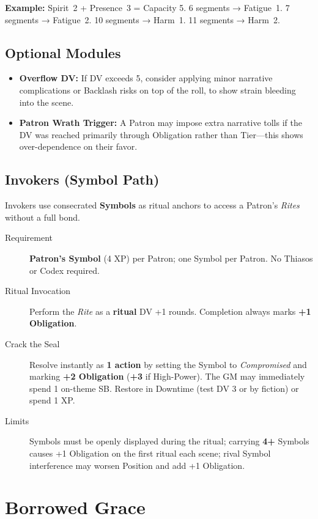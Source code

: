 \textbf{Example:} Spirit~2 + Presence~3 = Capacity 5.
6 segments → Fatigue~1.
7 segments → Fatigue~2.
10 segments → Harm~1.
11 segments → Harm~2.

\subsection*{Optional Modules}

\begin{itemize}
  \item \textbf{Overflow DV:} If DV exceeds 5, consider applying minor narrative complications or Backlash risks on top of the roll, to show strain bleeding into the scene.
  \item \textbf{Patron Wrath Trigger:} A Patron may impose extra narrative tolls if the DV was reached primarily through Obligation rather than Tier—this shows over-dependence on their favor.
\end{itemize}

\subsection{Invokers (Symbol Path)}
\label{subsec:invokers}

Invokers use consecrated \textbf{Symbols} as ritual anchors to access a Patron's \emph{Rites} without a full bond.

\begin{description}
\item[Requirement] \textbf{Patron's Symbol} (4 XP) per Patron; one Symbol per Patron. No Thiasos or Codex required.
\item[Ritual Invocation] Perform the \emph{Rite} as a \textbf{ritual} DV +1 rounds. Completion always marks \textbf{+1 Obligation}.
\item[Crack the Seal] Resolve instantly as \textbf{1 action} by setting the Symbol to \emph{Compromised} and marking \textbf{+2 Obligation} (\textbf{+3} if High-Power). The GM may immediately spend 1 on-theme SB. Restore in Downtime (test DV 3 or by fiction) or spend 1 XP.
\item[Limits] Symbols must be openly displayed during the ritual; carrying \textbf{4+} Symbols causes +1 Obligation on the first ritual each scene; rival Symbol interference may worsen Position and add +1 Obligation.
\end{description}

\section*{Borrowed Grace}
\label{talent:borrowed-grace}

